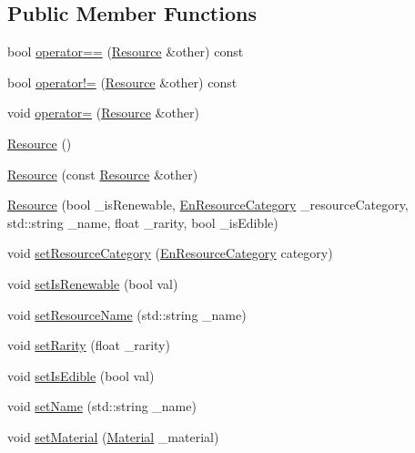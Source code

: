 \subsection*{Public Member Functions}
\begin{DoxyCompactItemize}
\item 
bool \mbox{\hyperlink{class_resource_a4bdd94c900d474b46b3be82cf7d2b177}{operator==}} (\mbox{\hyperlink{class_resource}{Resource}} \&other) const
\item 
bool \mbox{\hyperlink{class_resource_a3c75951bdaba141f3382023f6f99b456}{operator!=}} (\mbox{\hyperlink{class_resource}{Resource}} \&other) const
\item 
void \mbox{\hyperlink{class_resource_aaeb9617a6d1340121b1752893a2acaa5}{operator=}} (\mbox{\hyperlink{class_resource}{Resource}} \&other)
\item 
\mbox{\hyperlink{class_resource_a5a87b23dc0327bbf8d53c6f38f637f48}{Resource}} ()
\item 
\mbox{\hyperlink{class_resource_aab50bae0e1d2b39afc578c21e0d0b7b1}{Resource}} (const \mbox{\hyperlink{class_resource}{Resource}} \&other)
\item 
\mbox{\hyperlink{class_resource_a9eeccf834c6edda8deec957a9faf5352}{Resource}} (bool \+\_\+is\+Renewable, \mbox{\hyperlink{_resource_8hpp_abde177ff256dcb25ea4a492ad7335b82}{En\+Resource\+Category}} \+\_\+resource\+Category, std\+::string \+\_\+name, float \+\_\+rarity, bool \+\_\+is\+Edible)
\item 
void \mbox{\hyperlink{class_resource_adc6d68e48afd6949da3211ed2668ddbd}{set\+Resource\+Category}} (\mbox{\hyperlink{_resource_8hpp_abde177ff256dcb25ea4a492ad7335b82}{En\+Resource\+Category}} category)
\item 
void \mbox{\hyperlink{class_resource_a0782d1437059c7e8449b2c677f9c4b08}{set\+Is\+Renewable}} (bool val)
\item 
void \mbox{\hyperlink{class_resource_a651a4afa0312b61b86ca0255c9bc64d0}{set\+Resource\+Name}} (std\+::string \+\_\+name)
\item 
void \mbox{\hyperlink{class_resource_a50c203483e76ae918b16db164c212e08}{set\+Rarity}} (float \+\_\+rarity)
\item 
void \mbox{\hyperlink{class_resource_a1dab6f1bc6f8794735a6e64c43415587}{set\+Is\+Edible}} (bool val)
\item 
void \mbox{\hyperlink{class_resource_a644f765b367972686b6d0b9c7a0ce9dd}{set\+Name}} (std\+::string \+\_\+name)
\item 
void \mbox{\hyperlink{class_resource_a84958f14311775c18c24cb69d43a74d0}{set\+Material}} (\mbox{\hyperlink{class_material}{Material}} \+\_\+material)

\end{DoxyCompactItemize}
